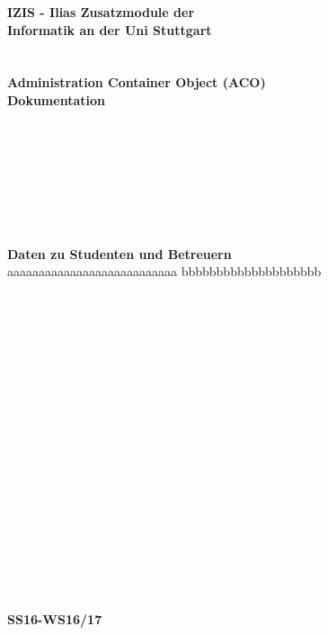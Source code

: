 
\begin{center}
	 \large\textbf{IZIS - Ilias Zusatzmodule der\\ Informatik an der Uni Stuttgart}
	 \\~\\~\\
	 \huge\textbf{Administration Container Object (ACO)\\Dokumentation}
\end{center}
~\\~\\~\\~\\~\\~\\~\\
	\large\textbf{Daten zu Studenten und Betreuern}\\
	aaaaaaaaaaaaaaaaaaaaaaaaaaa bbbbbbbbbbbbbbbbbbbb
	\\~\\\\~\\~\\~\\~\\~\\~\\~\\~\\~\\~\\~\\~\\~\\~\\~\\~\\
	 		
	 		
\begin{center}
	 \textbf{SS16-WS16/17}
\end{center}
	
	
 